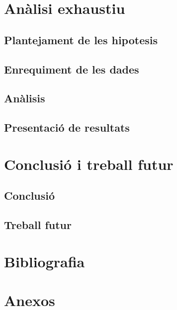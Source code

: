 \newpage
\section{Anàlisi exhaustiu}

\subsection{Plantejament de les hipotesis}

\subsection{Enrequiment de les dades}



\subsection{Anàlisis}

\subsection{Presentació de resultats}


\newpage
\section{Conclusió i treball futur}

\subsection{Conclusió}

\subsection{Treball futur}



\newpage
\section{Bibliografia}

\newpage
\section{Anexos}
